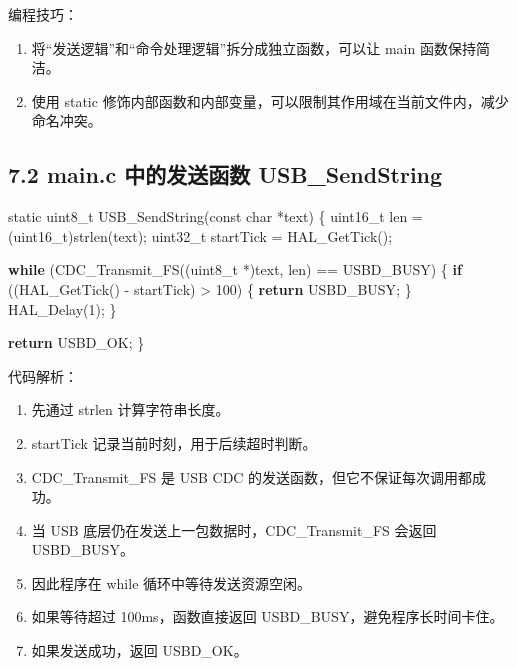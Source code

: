 \documentclass[
  chinese,
  UTF8,
  oneside,
  openany]{ctexbook}
\newenvironment{Shaded}{}{}
\newcommand{\ControlFlowTok}[1]{\textcolor[rgb]{0.00,0.44,0.13}{\textbf{#1}}}
\newcommand{\DataTypeTok}[1]{\textcolor[rgb]{0.56,0.13,0.00}{#1}}
\newcommand{\DecValTok}[1]{\textcolor[rgb]{0.25,0.63,0.44}{#1}}
\newcommand{\NormalTok}[1]{#1}
\newcommand{\OperatorTok}[1]{\textcolor[rgb]{0.40,0.40,0.40}{#1}}
\providecommand{\tightlist}{%
  \setlength{\itemsep}{0pt}\setlength{\parskip}{0pt}}
\begin{document}
编程技巧：

\begin{enumerate}
\def\labelenumi{\arabic{enumi}.}
\tightlist
\item
  将``发送逻辑''和``命令处理逻辑''拆分成独立函数，可以让 main
  函数保持简洁。
\item
  使用 static
  修饰内部函数和内部变量，可以限制其作用域在当前文件内，减少命名冲突。
\end{enumerate}

\subsection{7.2 main.c 中的发送函数
USB\_SendString}\label{main.c-ux4e2dux7684ux53d1ux9001ux51fdux6570-usb_sendstring}

\begin{Shaded}
\begin{Highlighting}[]
\DataTypeTok{static} \DataTypeTok{uint8\_t}\NormalTok{ USB\_SendString}\OperatorTok{(}\DataTypeTok{const} \DataTypeTok{char} \OperatorTok{*}\NormalTok{text}\OperatorTok{)}
\OperatorTok{\{}
    \DataTypeTok{uint16\_t}\NormalTok{ len }\OperatorTok{=} \OperatorTok{(}\DataTypeTok{uint16\_t}\OperatorTok{)}\NormalTok{strlen}\OperatorTok{(}\NormalTok{text}\OperatorTok{);}
    \DataTypeTok{uint32\_t}\NormalTok{ startTick }\OperatorTok{=}\NormalTok{ HAL\_GetTick}\OperatorTok{();}

    \ControlFlowTok{while} \OperatorTok{(}\NormalTok{CDC\_Transmit\_FS}\OperatorTok{((}\DataTypeTok{uint8\_t} \OperatorTok{*)}\NormalTok{text}\OperatorTok{,}\NormalTok{ len}\OperatorTok{)} \OperatorTok{==}\NormalTok{ USBD\_BUSY}\OperatorTok{)}
    \OperatorTok{\{}
        \ControlFlowTok{if} \OperatorTok{((}\NormalTok{HAL\_GetTick}\OperatorTok{()} \OperatorTok{{-}}\NormalTok{ startTick}\OperatorTok{)} \OperatorTok{\textgreater{}} \DecValTok{100}\OperatorTok{)}
        \OperatorTok{\{}
            \ControlFlowTok{return}\NormalTok{ USBD\_BUSY}\OperatorTok{;}
        \OperatorTok{\}}
\NormalTok{        HAL\_Delay}\OperatorTok{(}\DecValTok{1}\OperatorTok{);}
    \OperatorTok{\}}

    \ControlFlowTok{return}\NormalTok{ USBD\_OK}\OperatorTok{;}
\OperatorTok{\}}
\end{Highlighting}
\end{Shaded}

代码解析：

\begin{enumerate}
\def\labelenumi{\arabic{enumi}.}
\tightlist
\item
  先通过 strlen 计算字符串长度。
\item
  startTick 记录当前时刻，用于后续超时判断。
\item
  CDC\_Transmit\_FS 是 USB CDC 的发送函数，但它不保证每次调用都成功。
\item
  当 USB 底层仍在发送上一包数据时，CDC\_Transmit\_FS 会返回 USBD\_BUSY。
\item
  因此程序在 while 循环中等待发送资源空闲。
\item
  如果等待超过 100ms，函数直接返回 USBD\_BUSY，避免程序长时间卡住。
\item
  如果发送成功，返回 USBD\_OK。
\end{enumerate}
\end{document}
